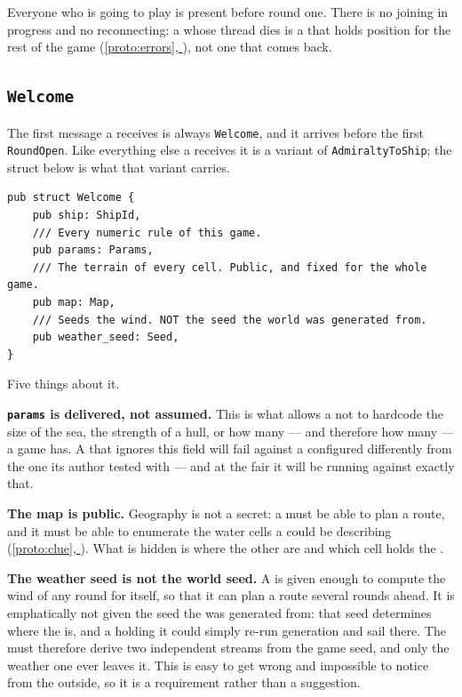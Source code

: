 \documentclass{article}
\newcommand{\fullref}[1]{\hyperref[#1]{\cref*{#1}, \nameref*{#1}}}
\begin{document}
Everyone who is going to play is present before round one. There is no joining in progress and no
reconnecting: a \ship{} whose thread dies is a \ship{} that holds position for the rest of the game
(\fullref{proto:errors}), not one that comes back.

\subsection{\texttt{Welcome}}

The first message a \ship{} receives is always \texttt{Welcome}, and it arrives before the first
\texttt{RoundOpen}. Like everything else a \ship{} receives it is a variant of
\texttt{AdmiraltyToShip}; the struct below is what that variant carries.

\begin{lstlisting}
pub struct Welcome {
    pub ship: ShipId,
    /// Every numeric rule of this game.
    pub params: Params,
    /// The terrain of every cell. Public, and fixed for the whole game.
    pub map: Map,
    /// Seeds the wind. NOT the seed the world was generated from.
    pub weather_seed: Seed,
}
\end{lstlisting}

Five things about it.

\textbf{\texttt{params} is delivered, not assumed.} This is what allows a \ship{} not to hardcode
the size of the sea, the strength of a hull, or how many \islands{} --- and therefore how many
\clues{} --- a game has. A \ship{} that
ignores this field will fail against a \chart{} configured differently from the one its author
tested with --- and at the fair it will be running against exactly that.

\textbf{The map is public.} Geography is not a secret: a \ship{} must be able to plan a route, and
it must be able to enumerate the water cells a \clue{} could be describing (\fullref{proto:clue}).
What is hidden is where the other \ships are and which cell holds the \treasure{}.

\textbf{The weather seed is not the world seed.} A \ship{} is given enough to compute the wind of
any round for itself, so that it can plan a route several rounds ahead. It is emphatically not given
the seed the \archipelago{} was generated from: that seed determines where the \treasure{} is, and a
\ship{} holding it could simply re-run generation and sail there. The \chart{} must therefore derive
two independent streams from the game seed, and only the weather one ever leaves it. This is easy to
get wrong and impossible to notice from the outside, so it is a requirement rather than a
suggestion.
\end{document}
